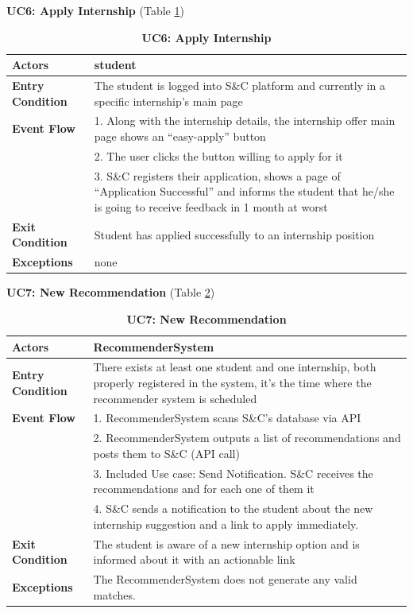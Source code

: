 \textbf{UC6: Apply Internship }(Table \ref{tab:UC6})
\begin{table}[H]
\centering
\caption{\textbf{UC6: Apply Internship}}
\label{tab:UC6}
\begin{tabularx}{\textwidth}{|X|X|}
\hline
\textbf{Actors}           & student                                                   \\ \hline
\textbf{Entry Condition}   & The student is logged into S\&C platform and currently in a specific internship’s main page \\ \hline
\textbf{Event Flow}        & 1. Along with the internship details, the internship offer main page shows an “easy-apply” button \\
                           & 2. The user clicks the button willing to apply for it       \\
                           & 3. S\&C registers their application, shows a page of “Application Successful” and informs the student that he/she is going to receive feedback in 1 month at worst \\ \hline
\textbf{Exit Condition}    & Student has applied successfully to an internship position \\ \hline
\textbf{Exceptions}        & none                                                      \\ \hline
\end{tabularx}
\end{table}



\textbf{UC7: New Recommendation }(Table \ref{tab:UC7})
\begin{table}[H]
\centering
\caption{\textbf{UC7: New Recommendation}}
\label{tab:UC7}
\begin{tabularx}{\textwidth}{|X|X|}
\hline
\textbf{Actors}           & RecommenderSystem                                         \\ \hline
\textbf{Entry Condition}   & There exists at least one student and one internship, both properly registered in the system, it’s the time where the recommender system is scheduled \\ \hline
\textbf{Event Flow}        & 1. RecommenderSystem scans S\&C’s database via API \\
                           & 2. RecommenderSystem outputs a list of recommendations and posts them to S\&C (API call) \\
                           & 3. Included Use case: Send Notification. S\&C receives the recommendations and for each one of them it \\
                           & 4. S\&C sends a notification to the student about the new internship suggestion and a link to apply immediately. \\ \hline
\textbf{Exit Condition}    & The student is aware of a new internship option and is informed about it with an actionable link \\ \hline
\textbf{Exceptions}        & The RecommenderSystem does not generate any valid matches.  \\ \hline
\end{tabularx}
\end{table}

